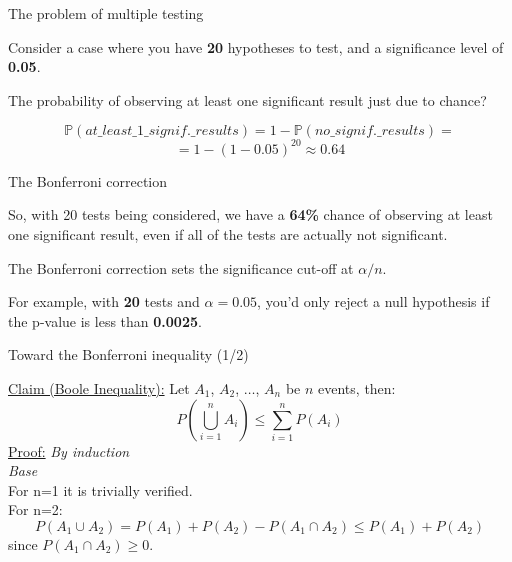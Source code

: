 \documentclass{beamer}
\begin{document}
\begin{frame}
{\centerline{The problem of multiple testing }}
Consider a case where you have \textbf{20} hypotheses to test, and a significance level of \textbf{0.05}. 
\newline

The probability of observing at least one significant result just due to chance?

$$\mathbb{P}(at\_least\_1\_signif.\_results) = 1 - \mathbb{P}(no\_signif.\_results) = $$
$$= 1 - (1-0.05)^{20} \approx 0.64$$


\end{frame}

\begin{frame}
{\centerline{The Bonferroni correction }}
So, with 20 tests being considered, we have a \textbf{64\%} chance of observing at least one significant result, even if all of the tests are actually not significant.
\newline

The Bonferroni correction sets the significance cut-off at $\alpha/n$. 
\newline

For example, with \textbf{20} tests and $\alpha = 0.05$, you’d only reject a null hypothesis if the p-value is less than \textbf{0.0025}.


\end{frame}


\begin{frame}
{\centerline{Toward the Bonferroni inequality (1/2)}}
\underline{Claim (Boole Inequality):} 
Let $A_1$, $A_2$, $\ldots$, $A_n$ be $n$ events, then:
$$ P({\bigcup_{i \mathop = 1}^n A_i}) \le \sum_{i \mathop = 1}^n P({A_i}) $$
\underline{Proof:}
\textit{By induction}\\
\textit{Base}\\
For n=1 it is trivially verified. \\
For n=2:
$$ P(A_1 \cup A_2) =   P(A_1) + P (A_2) - P(A_1 \cap A_2) \le P(A_1) + P (A_2)$$
since $P(A_1 \cap A_2) \ge 0$.


\end{frame}

\end{document}
